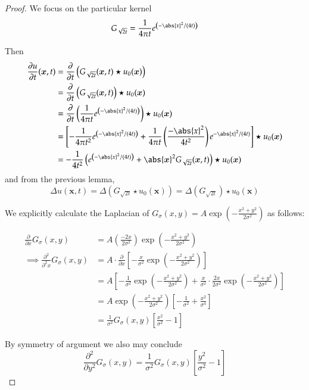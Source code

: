 \begin{proof}
	We focus on the particular kernel
	\[
		G_{\sqrt{2t}} = \frac{1}{4\pi t} e^{\left(-\abs{x}^2 / (4t)\right)}
		\]


Then
\begin{align}
\frac{\partial u}{\partial t} (\bm{x}, t)
	&= \frac{\partial}{\partial t} \left(G_{\sqrt{2t}}(\bm{x},t) \star u_0(\bm{x})\right)  \\
	&= \frac{\partial}{\partial t} \left(G_{\sqrt{2t}}(\bm{x},t)\right) \star u_0(\bm{x})  \\
	&= \frac{\partial}{\partial t} \left(
		\frac{1}{4\pi t} e^{\left(-\abs{x}^2 / (4t)\right)} \right) \star u_0(\bm{x}) \\
	&= \left[
	-\frac{1}{4\pi t^2} e^{\left(-\abs{x}^2 / (4t)\right)}
		+ \frac{1}{4\pi t}\left(\frac{-\abs{x}^2}{4t^2}\right) e^{-\abs{x}^2 / (4t)}
		\right] \star u_0(\bm{x}) \\
		&= -\frac{1}{4t^2} \left( e^{\left(-\abs{x}^2 / (4t)\right)} 
				+ \abs{\bm{x}}^2 G_{\sqrt{2t}}(\bm{x},t)
					\right) \star u_0(\bm{x})
\end{align}
and from the previous lemma,
\[
\Delta u(\bm{x}, t) = \Delta\left( G_{\sqrt{2t}} \star u_0(\bm{x})\right)
					= \Delta\left( G_{\sqrt{2t}} \right)\star u_0(\bm{x})
\]

We explicitly calculate the Laplacian of $G_{\sigma}(x,y) = A \exp(-\frac{x^2 + y^2}{2\sigma^2})$ as follows:

\begin{align*}
\frac{\partial}{\partial x} G_{\sigma}(x,y)
	&= A \left( \frac{-2x}{2\sigma^2}\right) \exp\left(-\frac{x^2 + y^2}{2\sigma^2}\right) \\
	\implies \frac{\partial^2}{\partial^2 x} G_{\sigma}(x,y)
	&= A \cdot \frac{\partial}{\partial x}
	\left[ - \frac{x}{\sigma^2} \exp\left(-\frac{x^2 + y^2}{2\sigma^2}\right) \right] \\
	&= A \left[ - \frac{1}{\sigma^2} \exp\left(-\frac{x^2 + y^2}{2\sigma^2}\right) 
		+ \frac{x}{\sigma^2} \cdot \frac{2x}{2\sigma^2} \exp\left(-\frac{x^2 + y^2}{2\sigma^2}\right) \right] \\
		&= A \exp\left(-\frac{x^2 + y^2}{2\sigma^2}\right)
			\left[ - \frac{1}{\sigma^2} + \frac{x^2}{\sigma^4} \right] \\
			&= \frac{1}{\sigma^2} G_\sigma(x,y)  \left[ \frac{x^2}{\sigma^2} - 1\right]
\end{align*}

By symmetry of argument we also may conclude
\[
\frac{\partial^2}{\partial y^2} G_{\sigma}(x,y) = \frac{1}{\sigma^2} G_\sigma(x,y)  \left[ \frac{y^2}{\sigma^2} - 1\right]
\]


\end{proof}
